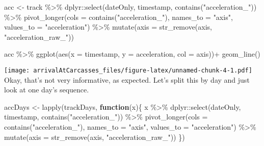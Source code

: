 \documentclass[
]{article}
\newenvironment{Shaded}{\begin{snugshade}}{\end{snugshade}}
\newcommand{\AttributeTok}[1]{\textcolor[rgb]{0.77,0.63,0.00}{#1}}
\newcommand{\ControlFlowTok}[1]{\textcolor[rgb]{0.13,0.29,0.53}{\textbf{#1}}}
\newcommand{\FunctionTok}[1]{\textcolor[rgb]{0.00,0.00,0.00}{#1}}
\newcommand{\NormalTok}[1]{#1}
\newcommand{\OtherTok}[1]{\textcolor[rgb]{0.56,0.35,0.01}{#1}}
\newcommand{\SpecialCharTok}[1]{\textcolor[rgb]{0.00,0.00,0.00}{#1}}
\newcommand{\StringTok}[1]{\textcolor[rgb]{0.31,0.60,0.02}{#1}}
\begin{document}
\begin{Shaded}
\begin{Highlighting}[]
\NormalTok{acc }\OtherTok{\textless{}{-}}\NormalTok{ track }\SpecialCharTok{\%\textgreater{}\%}
\NormalTok{  dplyr}\SpecialCharTok{::}\FunctionTok{select}\NormalTok{(dateOnly, timestamp, }\FunctionTok{contains}\NormalTok{(}\StringTok{"acceleration\_"}\NormalTok{)) }\SpecialCharTok{\%\textgreater{}\%}
  \FunctionTok{pivot\_longer}\NormalTok{(}\AttributeTok{cols =} \FunctionTok{contains}\NormalTok{(}\StringTok{"acceleration\_"}\NormalTok{), }\AttributeTok{names\_to =} \StringTok{"axis"}\NormalTok{, }\AttributeTok{values\_to =} \StringTok{"acceleration"}\NormalTok{) }\SpecialCharTok{\%\textgreater{}\%}
  \FunctionTok{mutate}\NormalTok{(}\AttributeTok{axis =} \FunctionTok{str\_remove}\NormalTok{(axis, }\StringTok{"acceleration\_raw\_"}\NormalTok{))}

\NormalTok{acc }\SpecialCharTok{\%\textgreater{}\%}
  \FunctionTok{ggplot}\NormalTok{(}\FunctionTok{aes}\NormalTok{(}\AttributeTok{x =}\NormalTok{ timestamp, }\AttributeTok{y =}\NormalTok{ acceleration, }\AttributeTok{col =}\NormalTok{ axis))}\SpecialCharTok{+}
  \FunctionTok{geom\_line}\NormalTok{()}
\end{Highlighting}
\end{Shaded}

\texttt{[image: arrivalAtCarcasses\_files/figure-latex/unnamed-chunk-4-1.pdf]}
Okay, that's not very informative, as expected. Let's split this by day
and just look at one day's sequence.

\begin{Shaded}
\begin{Highlighting}[]
\NormalTok{accDays }\OtherTok{\textless{}{-}} \FunctionTok{lapply}\NormalTok{(trackDays, }\ControlFlowTok{function}\NormalTok{(x)\{}
\NormalTok{  x }\SpecialCharTok{\%\textgreater{}\%}\NormalTok{ dplyr}\SpecialCharTok{::}\FunctionTok{select}\NormalTok{(dateOnly, timestamp, }\FunctionTok{contains}\NormalTok{(}\StringTok{"acceleration\_"}\NormalTok{)) }\SpecialCharTok{\%\textgreater{}\%}
    \FunctionTok{pivot\_longer}\NormalTok{(}\AttributeTok{cols =} \FunctionTok{contains}\NormalTok{(}\StringTok{"acceleration\_"}\NormalTok{), }\AttributeTok{names\_to =} \StringTok{"axis"}\NormalTok{, }\AttributeTok{values\_to =} \StringTok{"acceleration"}\NormalTok{) }\SpecialCharTok{\%\textgreater{}\%}
    \FunctionTok{mutate}\NormalTok{(}\AttributeTok{axis =} \FunctionTok{str\_remove}\NormalTok{(axis, }\StringTok{"acceleration\_raw\_"}\NormalTok{))}
\NormalTok{\})}
\end{Highlighting}
\end{Shaded}
\end{document}
